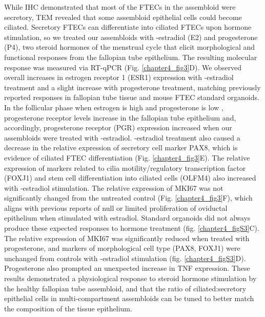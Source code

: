 \begin{refsection}
    While IHC demonstrated that most of the FTECs in the assembloid were secretory, TEM revealed that some assembloid epithelial cells could become ciliated. Secretory FTECs can differentiate into ciliated FTECs upon hormone stimulation\cite{fitzgerald2019a,donnez1985a,comer1998a,comer1998a,garcia-alonso2021a}, so we treated our assembloids with \textbeta-estradiol (E2) and progesterone (P4), two steroid hormones of the menstrual cycle that elicit morphological and functional responses from the fallopian tube epithelium\cite{barton2020a}. The resulting molecular response was measured via RT-qPCR (Fig. \ref{chapter4_fig3}D). We observed overall increases in estrogen receptor 1 (ESR1) expression with \textbeta-estradiol treatment and a slight increase with progesterone treatment, matching previously reported responses in fallopian tube tissue\cite{brodowska2021a} and mouse FTEC standard organoids\cite{xie2018a}. In the follicular phase when estrogen is high and progesterone is low \cite{monis-a}, progesterone receptor levels increase in the fallopian tube epithelium\cite{akison2012a} and, accordingly, progesterone receptor (PGR) expression increased when our assembloids were treated with \textbeta-estradiol. \textbeta-estradiol treatment also caused a decrease in the relative expression of secretory cell marker PAX8, which is evidence of ciliated FTEC differentiation (Fig. \ref{chapter4_fig3}E). The relative expression of markers related to cilia motility/regulatory transcription factor (FOXJ1)\cite{yu2008a,turco2017a} and stem cell differentiation into ciliated cells (OLFM4)\cite{gu2020a,li2020a} also increased with \textbeta-estradiol stimulation. The relative expression of MKI67 was not significantly changed from the untreated control (Fig. \ref{chapter4_fig3}F), which aligns with previous reports of null or limited proliferation of oviductal epithelium when stimulated with estradiol\cite{eddie2015a,moyle-heyrman2016a}. Standard organoids did not always produce these expected responses to hormone treatment (fig. \ref{chapter4_figS3}C). The relative expression of MKI67 was significantly reduced when treated with progesterone, and markers of morphological cell type (PAX8, FOXJ1) were unchanged from controls with \textbeta-estradiol stimulation (fig. \ref{chapter4_figS3}D). Progesterone also prompted an unexpected increase in TNF expression. These results demonstrated a physiological response to steroid hormone stimulation by the healthy fallopian tube assembloid, and that the ratio of ciliated:secretory epithelial cells in multi-compartment assembloids can be tuned to better match the composition of the tissue epithelium.

\end{refsection}
